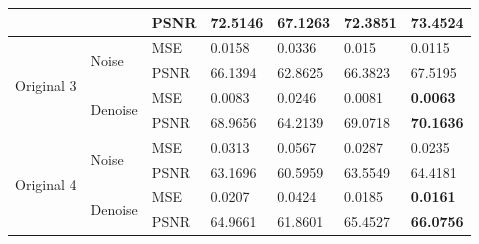 \begin{center}
\begin{tabular}{llllllllllll|l|l|l|l|l|l|l|l|l|l|l|l|l|}
\multicolumn{4}{|l|}{}                            & \multicolumn{4}{l|}{}                         & \multicolumn{4}{l|}{PSNR} & \multicolumn{3}{l|}{72.5146} & \multicolumn{3}{l|}{67.1263}          & \multicolumn{4}{l|}{72.3851}  & \multicolumn{3}{l|}{\textbf{73.4524}} \\ \hline
\multicolumn{4}{|l|}{\multirow{4}{*}{Original 3}} & \multicolumn{4}{l|}{\multirow{2}{*}{Noise}}   & \multicolumn{4}{l|}{MSE}  & \multicolumn{3}{l|}{0.0158}  & \multicolumn{3}{l|}{0.0336}           & \multicolumn{4}{l|}{0.015}    & \multicolumn{3}{l|}{0.0115}           \\ \cline{9-25} 
\multicolumn{4}{|l|}{}                            & \multicolumn{4}{l|}{}                         & \multicolumn{4}{l|}{PSNR} & \multicolumn{3}{l|}{66.1394} & \multicolumn{3}{l|}{62.8625}          & \multicolumn{4}{l|}{66.3823}  & \multicolumn{3}{l|}{67.5195}          \\ \cline{5-25} 
\multicolumn{4}{|l|}{}                            & \multicolumn{4}{l|}{\multirow{2}{*}{Denoise}} & \multicolumn{4}{l|}{MSE}  & \multicolumn{3}{l|}{0.0083}  & \multicolumn{3}{l|}{0.0246}           & \multicolumn{4}{l|}{0.0081}   & \multicolumn{3}{l|}{\textbf{0.0063}}  \\ \cline{9-25} 
\multicolumn{4}{|l|}{}                            & \multicolumn{4}{l|}{}                         & \multicolumn{4}{l|}{PSNR} & \multicolumn{3}{l|}{68.9656} & \multicolumn{3}{l|}{64.2139}          & \multicolumn{4}{l|}{69.0718}  & \multicolumn{3}{l|}{\textbf{70.1636}} \\ \hline
\multicolumn{4}{|l|}{\multirow{4}{*}{Original 4}} & \multicolumn{4}{l|}{\multirow{2}{*}{Noise}}   & \multicolumn{4}{l|}{MSE}  & \multicolumn{3}{l|}{0.0313}  & \multicolumn{3}{l|}{0.0567}           & \multicolumn{4}{l|}{0.0287}   & \multicolumn{3}{l|}{0.0235}           \\ \cline{9-25} 
\multicolumn{4}{|l|}{}                            & \multicolumn{4}{l|}{}                         & \multicolumn{4}{l|}{PSNR} & \multicolumn{3}{l|}{63.1696} & \multicolumn{3}{l|}{60.5959}          & \multicolumn{4}{l|}{63.5549}  & \multicolumn{3}{l|}{64.4181}          \\ \cline{5-25} 
\multicolumn{4}{|l|}{}                            & \multicolumn{4}{l|}{\multirow{2}{*}{Denoise}} & \multicolumn{4}{l|}{MSE}  & \multicolumn{3}{l|}{0.0207}  & \multicolumn{3}{l|}{0.0424}           & \multicolumn{4}{l|}{0.0185}   & \multicolumn{3}{l|}{\textbf{0.0161}}  \\ \cline{9-25} 
\multicolumn{4}{|l|}{}                            & \multicolumn{4}{l|}{}                         & \multicolumn{4}{l|}{PSNR} & \multicolumn{3}{l|}{64.9661} & \multicolumn{3}{l|}{61.8601}          & \multicolumn{4}{l|}{65.4527}  & \multicolumn{3}{l|}{\textbf{66.0756}} \\ \hline

\end{tabular}
\end{center}
